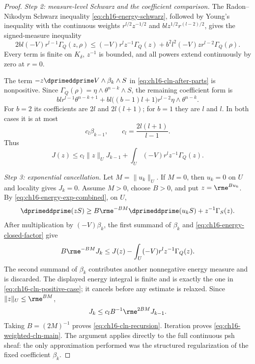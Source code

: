 \begin{proof}
\emph{Step 2: measure-level Schwarz and the coefficient comparison.}
The Radon--Nikodym Schwarz inequality
\eqref{eq:ch16-energy-schwarz}, followed by Young's inequality with the
continuous weights $r^{l/2}z^{-1/2}$ and
$blz^{1/2}r^{(l-2)/2}$, gives the signed-measure inequality
\begin{equation}
\label{eq:ch16-cln-cauchy}
 2bl(-V)r^{l-1}\Gamma_Q(z,\rho)
 \leq(-V)r^lz^{-1}\Gamma_Q(z)
   +b^2l^2(-V)zr^{l-2}\Gamma_Q(\rho).
\end{equation}
Every term is finite on $K_\delta$, $z^{-1}$ is bounded, and all powers
extend continuously by zero at $r=0$.

The term $-z\dprimeddprime V\wedge\beta_k\wedge S$ in
\eqref{eq:ch16-cln-after-parts} is nonpositive.  Since
$\Gamma_Q(\rho)=\eta\wedge\theta^{n-k}\wedge S$, the remaining coefficient
form is
\[
 blr^{l-1}\theta^{n-k+1}
 +bl\bigl((b-1)l+1\bigr)r^{l-2}\eta\wedge\theta^{n-k}.
\]
For $b=2$ its coefficients are $2l$ and $2l(l+1)$; for $b=1$ they are
$l$ and $l$.  In both cases it is at most
\begin{equation}
\label{eq:ch16-cln-coefficient}
 c_l\beta_{k-1},\qquad c_l=\frac{2l(l+1)}{l-1}.
\end{equation}
Thus
\begin{equation}
\label{eq:ch16-cln-positive-case}
 J(z)\leq c_l\|z\|_U J_{k-1}
   +\int_U(-V)r^lz^{-1}\Gamma_Q(z).
\end{equation}

\emph{Step 3: exponential cancellation.}
Let $M=\|u_k\|_U$.  If $M=0$, then $u_k=0$ on $U$ and locality gives
$J_k=0$.  Assume $M>0$, choose $B>0$, and put $z=\rme^{Bu_k}$.
By \eqref{eq:ch16-energy-exp-combined}, on $U$,
\[
 \dprimeddprime(zS)\geq
 B\rme^{-BM}\dprimeddprime(u_kS)+z^{-1}\Gamma_S(z).
\]
After multiplication by $(-V)\beta_k$, the first summand of $\beta_k$ and
\eqref{eq:ch16-energy-closed-factor} give
\[
 B\rme^{-BM}J_k
 \leq J(z)-\int_U(-V)r^lz^{-1}\Gamma_Q(z).
\]
The second summand of $\beta_k$ contributes another nonnegative energy
measure and is discarded.  The displayed energy integral is finite and is
exactly the one in \eqref{eq:ch16-cln-positive-case}; it cancels before any
estimate is relaxed.  Since $\|z\|_U\leq\rme^{BM}$,
\[
 J_k\leq c_lB^{-1}\rme^{2BM}J_{k-1}.
\]
Taking $B=(2M)^{-1}$ proves \eqref{eq:ch16-cln-recursion}.  Iteration proves
\eqref{eq:ch16-weighted-cln-main}.  The argument applies directly to the
full continuous psh sheaf: the only approximation performed was the
structured regularization of the fixed coefficient $\beta_k$.
\end{proof}

